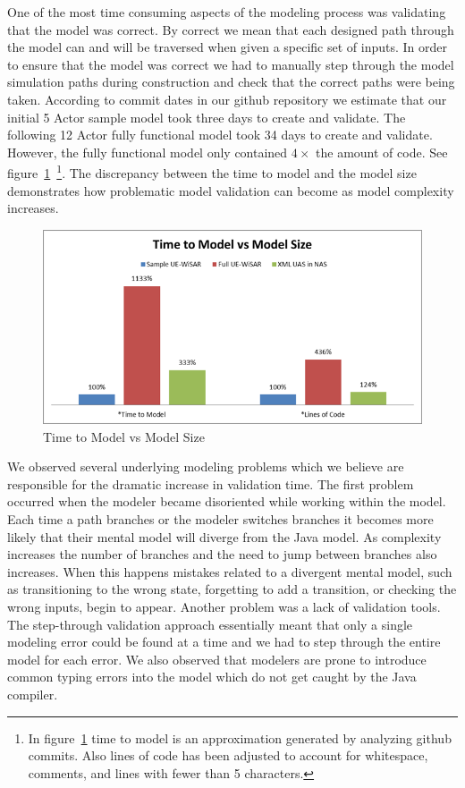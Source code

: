 One of the most time consuming aspects of the modeling process was validating that the model was correct.  By correct we mean that each designed path through the model can and will be traversed when given a specific set of inputs.  In order to ensure that the model was correct we had to manually step through the model simulation paths during construction and check that the correct paths were being taken.  According to commit dates in our github repository we estimate that our initial 5 Actor sample model took three days to create and validate.  The following 12 Actor fully functional model took 34 days to create and validate.  However, the fully functional model only contained $4\times$ the amount of code.  See figure~\ref{fig:time_to_model}~\footnote{In figure~\ref{fig:time_to_model} time to model is an approximation generated by analyzing github commits.  Also lines of code has been adjusted to account for whitespace, comments, and lines with fewer than 5 characters.}.  The discrepancy between the time to model and the model size demonstrates how problematic model validation can become as model complexity increases.

\begin{figure}[h]
\begin{center}
\includegraphics[width=5in]{time_to_model.png}
\caption{Time to Model vs Model Size}
\label{fig:time_to_model}
\end{center}
\end{figure}

We observed several underlying modeling problems which we believe are responsible for the dramatic increase in validation time.  The first problem occurred when the modeler became disoriented while working within the model.  Each time a path branches or the modeler switches branches it becomes more likely that their mental model will diverge from the Java model.  As complexity increases the number of branches and the need to jump between branches also increases.  When this happens mistakes related to a divergent mental model, such as transitioning to the wrong state, forgetting to add a transition, or checking the wrong inputs, begin to appear.  Another problem was a lack of validation tools.  The step-through validation approach essentially meant that only a single modeling error could be found at a time and we had to step through the entire model for each error.  We also observed that modelers are prone to introduce common typing errors into the model which do not get caught by the Java compiler.  

